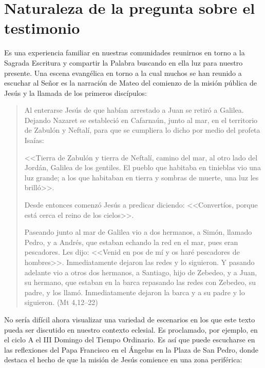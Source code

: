 \section{Naturaleza de la pregunta sobre el testimonio}
Es una experiencia familiar en nuestras comunidades reunirnos en torno a la Sagrada Escritura y compartir la Palabra buscando en ella luz para nuestro presente. Una escena evangélica en torno a la cual muchos se han reunido a escuchar al Señor es la narración de Mateo del comienzo de la misión pública de Jesús y la llamada de los primeros discípulos: \blockquote[]{Al enterarse Jesús de que habían arrestado a Juan se retiró a Galilea. Dejando Nazaret se estableció en Cafarnaún, junto al mar, en el territorio de Zabulón y Neftalí, para que se cumpliera lo dicho por medio del profeta Isaías:

<<Tierra de Zabulón y tierra de Neftalí, camino del mar, al otro lado del Jordán, Galilea de los gentiles. El pueblo que habitaba en tinieblas vio una luz grande; a los que habitaban en tierra y sombras de muerte, una luz les brilló>>.

Desde entonces comenzó Jesús a predicar diciendo: <<Convertíos, porque está cerca el reino de los cielos>>.

Paseando junto al mar de Galilea vio a dos hermanos, a Simón, llamado Pedro, y a Andrés, que estaban echando la red en el mar, pues eran pescadores. Les dijo: <<Venid en pos de mí y os haré pescadores de hombres>>. Inmediatamente dejaron las redes y lo siguieron. Y pasando adelante vio a otros dos hermanos, a Santiago, hijo de Zebedeo, y a Juan, su hermano, que estaban en la barca repasando las redes con Zebedeo, su padre, y los llamó. Inmediatamente dejaron la barca y a su padre y lo siguieron. (Mt 4,12--22)}

No sería difícil ahora visualizar una variedad de escenarios en los que este texto pueda ser discutido en nuestro contexto eclesial. Es proclamado, por ejemplo, en el ciclo A el III Domingo del Tiempo Ordinario. Es así que puede escucharse en las reflexiones del Papa Francisco en el Ángelus en la Plaza de San Pedro, donde destaca el hecho de que la misión de Jesús comience en una zona periférica: 

